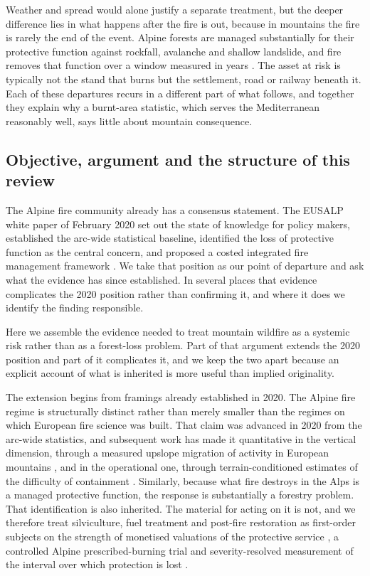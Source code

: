 \documentclass[11pt,a4paper]{article}
\begin{document}
Weather and spread would alone justify a separate treatment, but the deeper difference lies in what happens after the fire is out, because in mountains the fire is rarely the end of the event. Alpine forests are managed substantially for their protective function against rockfall, avalanche and shallow landslide, and fire removes that function over a window measured in years \citep{melzner_wildfire-induced_2025, melzner_brief_2019}. The asset at risk is typically not the stand that burns but the settlement, road or railway beneath it. Each of these departures recurs in a different part of what follows, and together they explain why a burnt-area statistic, which serves the Mediterranean reasonably well, says little about mountain consequence.

\subsection{Objective, argument and the structure of this review}

The Alpine fire community already has a consensus statement. The EUSALP white paper of February 2020 set out the state of knowledge for policy makers, established the arc-wide statistical baseline, identified the loss of protective function as the central concern, and proposed a costed integrated fire management framework \citep{muller_forest_2020}. We take that position as our point of departure and ask what the evidence has since established. In several places that evidence complicates the 2020 position rather than confirming it, and where it does we identify the finding responsible.

Here we assemble the evidence needed to treat mountain wildfire as a systemic risk rather than as a forest-loss problem. Part of that argument extends the 2020 position and part of it complicates it, and we keep the two apart because an explicit account of what is inherited is more useful than implied originality.

The extension begins from framings already established in 2020. The Alpine fire regime is structurally distinct rather than merely smaller than the regimes on which European fire science was built. That claim was advanced in 2020 from the arc-wide statistics, and subsequent work has made it quantitative in the vertical dimension, through a measured upslope migration of activity in European mountains \citep{beloiu_climatedriven_2026}, and in the operational one, through terrain-conditioned estimates of the difficulty of containment \citep{cardil_assessing_2025}. Similarly, because what fire destroys in the Alps is a managed protective function, the response is substantially a forestry problem. That identification is also inherited. The material for acting on it is not, and we therefore treat silviculture, fuel treatment and post-fire restoration as first-order subjects on the strength of monetised valuations of the protective service \citep{accastello_asforesee_2019, moos_climate_2021}, a controlled Alpine prescribed-burning trial \citep{gamba_prescribed_2025} and severity-resolved measurement of the interval over which protection is lost \citep{melzner_wildfire-induced_2025}.
\end{document}
